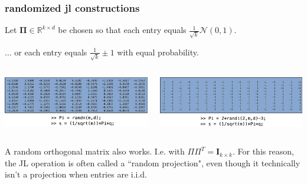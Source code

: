 \documentclass[compress]{beamer}
\newcommand{\bs}[1]{\boldsymbol{#1}}
\newcommand{\bv}[1]{\mathbf{#1}}
\newcommand{\R}{\mathbb{R}}
\begin{document}
\begin{frame}
	\frametitle{randomized jl constructions}
	\begin{center}
		Let $\bs{\Pi} \in \R^{k\times d}$ be chosen so that each entry equals $\frac{1}{\sqrt{k}}  \mathcal{N}(0,1)$.
		
		... or each entry equals $\frac{1}{\sqrt{k}}  \pm 1$ with equal probability.
	\end{center}
	\vspace{1em}
	
	\begin{columns}
		\begin{column}{0.5\textwidth}
			\includegraphics[width=\textwidth]{rand_gauss.png}
		\end{column}
		\begin{column}{0.5\textwidth}
			\includegraphics[width=\textwidth]{rand_sign.png}
		\end{column}
	\end{columns}
	
	\begin{center}
		A random orthogonal matrix also works. I.e. with $\Pi\Pi^T = \bv{I}_{k\times k}$. For this reason, the JL operation is often called a ``random projection", even though it technically isn't a projection when entries are i.i.d.
	\end{center}
\end{frame}
\end{document}
